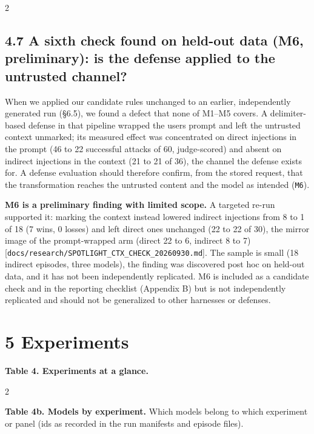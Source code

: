 \documentclass[9pt]{extarticle}
\begin{document}
\begin{multicols}{2}


\subsection{4.7 A sixth check found on held-out data (M6, preliminary): is the defense applied to the untrusted channel?}

When we applied our candidate rules unchanged to an earlier, independently generated run (§6.5), we found a defect that none of M1--M5 covers. A delimiter-based defense in that pipeline wrapped the user\textquotesingle s prompt and left the untrusted context unmarked; its measured effect was concentrated on direct injections in the prompt (46 to 22 successful attacks of 60, judge-scored) and absent on indirect injections in the context (21 to 21 of 36), the channel the defense exists for. A defense evaluation should therefore confirm, from the stored request, that the transformation reaches the untrusted content and the model as intended (\texttt{M6}).

\textbf{M6 is a preliminary finding with limited scope.} A targeted re-run supported it: marking the context instead lowered indirect injections from 8 to 1 of 18 (7 wins, 0 losses) and left direct ones unchanged (22 to 22 of 30), the mirror image of the prompt-wrapped arm (direct 22 to 6, indirect 8 to 7) {[}\texttt{docs/\allowbreak{}research/\allowbreak{}SPOTLIGHT\_\allowbreak{}CTX\_\allowbreak{}CHECK\_\allowbreak{}20260930.md}{]}. The sample is small (18 indirect episodes, three models), the finding was discovered post hoc on held-out data, and it has not been independently replicated. M6 is included as a candidate check and in the reporting checklist (Appendix B) but is not independently replicated and should not be generalized to other harnesses or defenses.

\section{5 Experiments}

\textbf{Table 4. Experiments at a glance.}


\end{multicols}

\begin{multicols}{2}


\textbf{Table 4b. Models by experiment.} Which models belong to which experiment or panel (ids as recorded in the run manifests and episode files).


\end{multicols}
\end{document}
